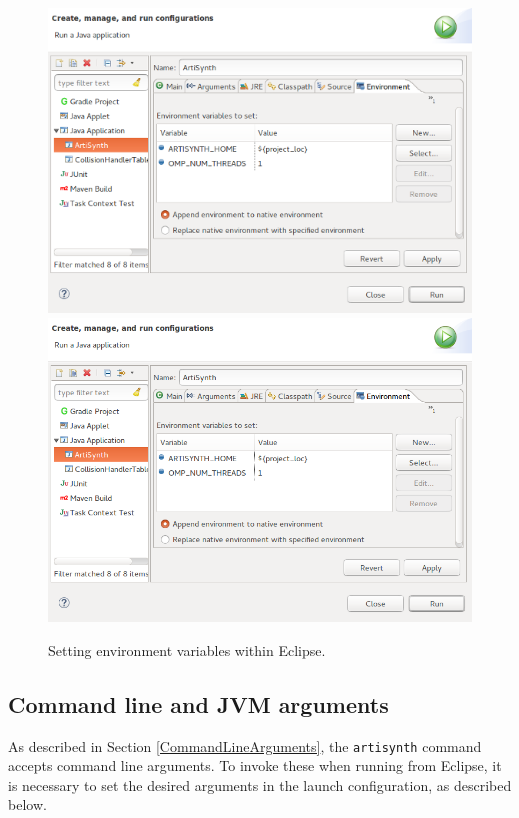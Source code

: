 \begin{figure}
\begin{center}
\iflatexml
\includegraphics[]{images/EclipseEnvVariablesSmall}
\else
\includegraphics[width=5.0in]{images/EclipseEnvVariables}
\fi
\end{center}
\caption{Setting environment variables within Eclipse.}%
\label{EclipseEnvVariables:fig}
\end{figure}

\subsection{Command line and JVM arguments}
\label{EclipseCommandArguments}

As described in Section \ref{CommandLineArguments}, the {\tt artisynth}
command accepts command line arguments. To invoke these when
running from Eclipse, it is necessary to set the desired arguments in
the launch configuration, as described below. 


